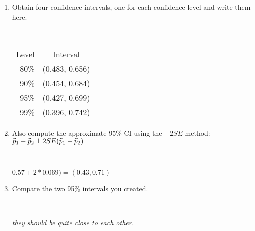 \begin{enumerate}
\begin{enumerate}
\item Obtain four confidence intervals, one for each confidence
      level and write them here.
\begin{students}
 \ \   \vspace*{1cm}\\
\end{students}
\begin{key}
  \begin{tabular}{|r|c|}
    \hline
  Level & Interval \\
  80\%& (0.483, 0.656) \\
  90\% & (0.454, 0.684) \\
  95\% &(0.427, 0.699) \\
  99\% & (0.396, 0.742)
  \end{tabular}
\end{key}

\item Also compute the approximate 95\% CI using the $\pm 2 SE$ method:
  $\widehat{p}_1 - \widehat{p}_2 \pm 2 SE(\widehat{p}_1-\widehat{p}_2)$ 
\begin{students}
 \ \   \vspace*{1cm}\\
\end{students}
\begin{key}
   $ 0.57 \pm 2 * 0.069) =  (0.43, 0.71) $  
\end{key}
\item Compare the two 95\% intervals you created.
\begin{students}
 \ \   \vspace*{2cm}\\
\end{students}
\begin{key}
   {\it they should be quite close to each other.}\\
\end{key}


\end{enumerate}
\end{enumerate}
